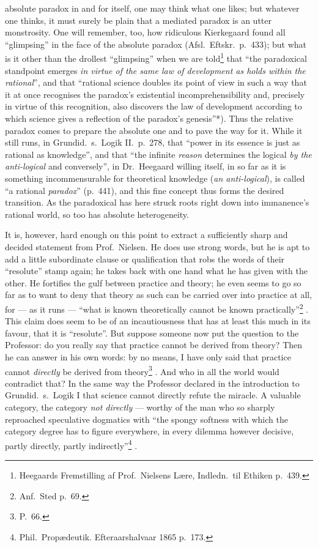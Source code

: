 \documentclass[12pt,a4paper]{book}
\renewcommand{\thefootnote}{*)}
\newcommand{\fnmark}[2]{\renewcommand{\thefootnote}{#1}\footnote{#2}%
  \renewcommand{\thefootnote}{*)}}
\newcommand{\opage}[1]{\marginnote{\footnotesize\textit{[#1]}}}
\begin{document}
absolute paradox in and for itself, one may think what one likes; but whatever
one thinks, it must surely be plain that a mediated paradox is an utter
monstrosity. One will remember, too, how ridiculous Kierkegaard found all
``glimpsing'' in the face of the absolute paradox (Afsl.\ Eftskr.\ p.\ 433);
but what is it other than the drollest ``glimpsing'' when we are
told\fnmark{*)}{Heegaards Fremstilling af Prof.\ Nielsens Lære, Indledn.\ til
Ethiken p.\ 439.} that ``the paradoxical standpoint emerges \emph{in virtue of
the same law of development as holds within the rational}'', and that ``rational
science doubles its point of view in such a way that it at once recognises the
paradox's existential incomprehensibility and, precisely in virtue of this
recognition, also discovers the law of development according to which science
gives a reflection of the paradox's genesis''*).
Thus the relative paradox comes to prepare the absolute one and to pave the way
for it. While it still runs, in Grundid.\ s.\ Logik II.\ p.\ 278, that ``power
in its essence is just as rational as knowledge'', and that ``the infinite
\emph{reason} determines the logical \emph{by the anti-logical} and
conversely'', in Dr.\ Heegaard willing itself, in so far as it is something
incommensurable for theoretical knowledge (\emph{an anti-logical}), is called
``a rational \emph{paradox}'' (p.\ 441), and this fine concept
\opage{58}thus forms the desired transition. As the paradoxical has here struck
roots right down into immanence's rational world, so too has absolute
heterogeneity.

It is, however, hard enough on this point to extract a sufficiently sharp and
decided statement from Prof.\ Nielsen. He does use strong words, but he is apt
to add a little subordinate clause or qualification that robs the words of
their ``resolute'' stamp again; he takes back with one hand what he has given
with the other. He fortifies the gulf between practice and theory; he even
seems to go so far as to want to deny that theory as such can be carried over
into practice at all, for --- as it runs --- ``what is known theoretically
cannot be known practically''\fnmark{*)}{Anf.\ Sted p.\ 69.}. This claim does
seem to be of an incautiousness that has at least this much in its favour, that
it is ``resolute''. But suppose someone now put the question to the Professor:
do you really say that practice cannot be derived from theory? Then he can
answer in his own words: by no means, I have only said that practice cannot
\emph{directly} be derived from theory\fnmark{**)}{P.\ 66.}. And who in all the
world would contradict that? In the same way the Professor declared in the
introduction to Grundid.\ s.\ Logik I that science cannot directly refute the
miracle. A valuable category,
\opage{59}the category \emph{not directly} --- worthy of the man who so sharply
reproached speculative dogmatics with ``the spongy softness with which the
category degree has to figure everywhere, in every dilemma however decisive,
partly directly, partly indirectly''\fnmark{*)}{Phil.\ Propædeutik.
Efteraarshalvaar 1865 p.\ 173.}.
\end{document}
